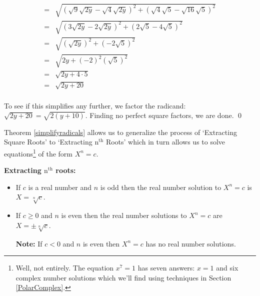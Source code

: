 \documentclass{ximera}
\begin{document}
\begin{example}
\begin{explanation}
\begin{enumerate}
\[\begin{array}{rclr}
& = & \sqrt{(\sqrt{9} \sqrt{2y} - \sqrt{4}\sqrt{2y})^2 + (\sqrt{4}\sqrt{5} - \sqrt{16}\sqrt{5})^2} & \\ 


& = & \sqrt{(3\sqrt{2y} - 2\sqrt{2y})^2 + (2\sqrt{5} - 4\sqrt{5})^2} & \\ 

& = & \sqrt{(\sqrt{2y})^2 + (-2\sqrt{5})^2} & \\ 


& = & \sqrt{2y + (-2)^2(\sqrt{5})^2} & \\ 


& = & \sqrt{2y + 4\cdot 5} & \\ 

& = & \sqrt{2y + 20} & \\ 

\end{array} \]

To see if this simplifies any further, we factor the radicand:  $\sqrt{2y+20} = \sqrt{2(y+10)}$.  Finding no perfect square factors, we are done. \qed

\end{enumerate}
\end{explanation}
\end{example}

Theorem \ref{simplifyradicals} allows us to generalize the process of `Extracting Square Roots' to `Extracting $\text{n}^{\text{th}}$ Roots' which in turn allows us to solve equations\footnote{Well, not entirely.  The equation $x^{7} = 1$ has seven answers: $x = 1$ and six complex number solutions which we'll find using techniques in Section \ref{PolarComplex}.} of the form $X^n  = c$.

\label{extractingnthroots}

 


\centerline{\textbf{Extracting $\text{n}^{\text{th}}$ roots:}}

\begin{itemize}

\item If $c$ is a real number and $n$ is odd then the real number solution to $X^{n} = c$ is $X = \sqrt[n]{c}$.

\item  If $c \geq 0$ and $n$ is even then the real number solutions to $X^{n} = c$ are $X = \pm \sqrt[n]{c}$.

\textbf{Note:} If $c < 0$ and $n$ is even then $X^{n} = c$ has no real number solutions.

\end{itemize}
\end{document}
